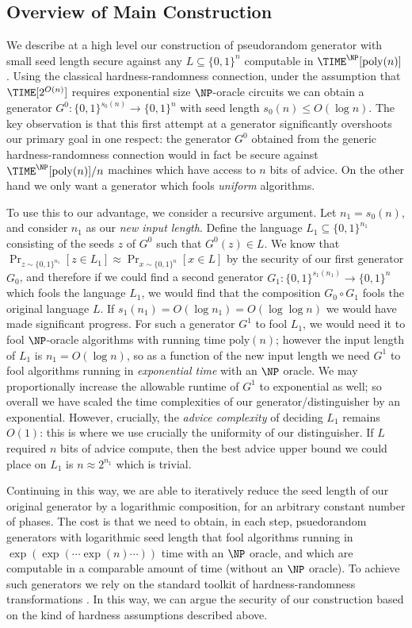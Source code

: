 \documentclass[11pt]{article}
\newcommand{\B}{\{0,1\}}
\renewcommand{\poly}{\mathrm{poly}}
\begin{document}
\subsection{Overview of Main Construction}
We describe at a high level our construction of pseudorandom generator with small seed length secure against any $L \subseteq \B^n$ computable in $\TIME^\NP[\poly(n)]$. Using the classical hardness-randomness connection, under the assumption that $\TIME[2^{O(n)}]$ requires exponential size $\NP$-oracle circuits we can obtain a generator $G^0: \B^{s_0(n)} \to \B^n$ with seed length $s_0(n) \leq O(\log n)$. The key observation is that this first attempt at a generator significantly overshoots our primary goal in one respect: the generator $G^0$ obtained from the generic hardness-randomness connection would in fact be secure against $\TIME^\NP[\poly(n)]/n$ machines which have access to $n$ bits of advice. On the other hand we only want a generator which fools \emph{uniform} algorithms. 

To use this to our advantage, we consider a recursive argument. Let $n_1 = s_0(n)$, and consider $n_1$ as our \emph{new input length}. Define the language $L_1 \subseteq \B^{n_1}$ consisting of the seeds $z$ of $G^0$ such that $G^0(z) \in L$. We know that $\Pr_{z \sim \B^{n_1}}[z \in L_1] \approx \Pr_{x \sim \B^n}[x \in L]$ by the security of our first generator $G_0$, and therefore if we could find a second generator $G_1: \B^{s_1(n_1)} \to \B^n$ which fools the language $L_1$, we would find that the composition $G_0 \circ G_1$ fools the original language $L$. If $s_1(n_1) = O(\log  n_1) = O(\log \log n)$ we would have made significant progress. For such a generator $G^1$ to fool $L_1$, we would need it to fool $\NP$-oracle algorithms with running time $\poly(n)$; however the input length of $L_1$ is $n_1 = O(\log n)$, so as a function of the new input length we need $G^1$ to fool algorithms running in \emph{exponential time} with an $\NP$ oracle. We may proportionally increase the allowable runtime of $G^1$ to exponential as well; so overall we have scaled the time complexities of our generator/distinguisher by an exponential. However, crucially, the \emph{advice complexity} of deciding $L_1$ remains $O(1)$: this is where we use crucially the uniformity of our distinguisher. If $L$ required $n$ bits of advice compute, then the best advice upper bound we could place on $L_1$ is $n\approx 2^{n_1}$ which is trivial.

Continuing in this way, we are able to iteratively reduce the seed length of our original generator by a logarithmic composition, for an arbitrary constant number of phases. The cost is that we need to obtain, in each step, psuedorandom generators with logarithmic seed length that fool algorithms running in $\exp(\exp(\cdots \exp(n) \cdots ))$ time with an $\NP$ oracle, and which are computable in a comparable amount of time (without an $\NP$ oracle). To achieve such generators we rely on the standard toolkit of hardness-randomness transformations \cite{NW94,IW97,umans}. In this way, we can argue the security of our construction based on the kind of hardness assumptions described above.
\end{document}
